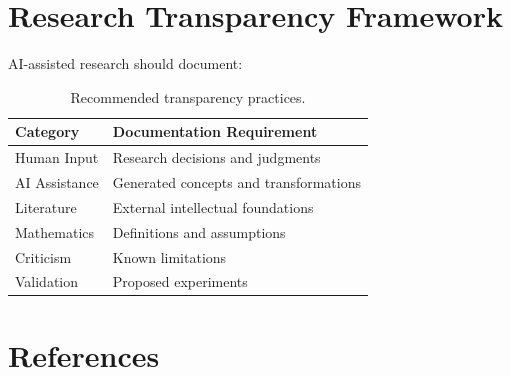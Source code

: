 \documentclass[11pt]{article}
\begin{document}
\section{Research Transparency Framework}


AI-assisted research should document:


\begin{table}[h]

\centering

\begin{tabular}{ll}

\toprule

Category & Documentation Requirement \\

\midrule

Human Input
& Research decisions and judgments
\\

AI Assistance
& Generated concepts and transformations
\\

Literature
& External intellectual foundations
\\

Mathematics
& Definitions and assumptions
\\

Criticism
& Known limitations
\\

Validation
& Proposed experiments
\\

\bottomrule

\end{tabular}


\caption{
Recommended transparency practices.
}

\end{table}



\section{References}
\end{document}
